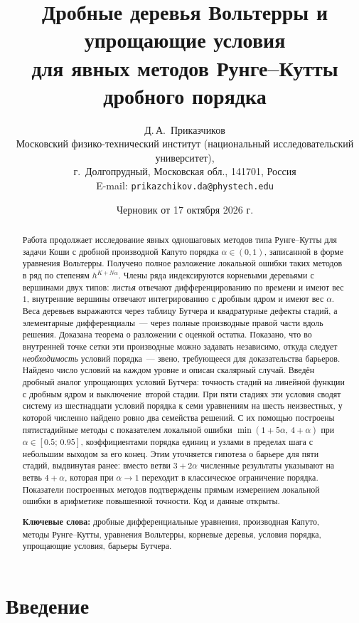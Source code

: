 \documentclass[11pt,a4paper]{article}
\title{Дробные деревья Вольтерры и упрощающие условия\\ для явных методов Рунге--Кутты дробного порядка}
\author{Д.\,А.~Приказчиков\\[2pt]
\small Московский физико-технический институт (национальный исследовательский университет),\\
\small г.~Долгопрудный, Московская обл., 141701, Россия\\
\small E-mail: \texttt{prikazchikov.da@phystech.edu}}
\date{Черновик от 17 октября 2026 г.}
\theoremstyle{plain}
\theoremstyle{definition}
\begin{document}
\maketitle

\begin{abstract}
Работа продолжает исследование явных одношаговых методов типа Рунге--Кутты для задачи Коши с дробной производной Капуто порядка $\alpha\in(0,1)$, записанной в форме уравнения Вольтерры. Получено полное разложение локальной ошибки таких методов в ряд по степеням $h^{K+N\alpha}$. Члены ряда индексируются корневыми деревьями с вершинами двух типов: листья отвечают дифференцированию по времени и имеют вес $1$, внутренние вершины отвечают интегрированию с дробным ядром и имеют вес $\alpha$. Веса деревьев выражаются через таблицу Бутчера и квадратурные дефекты стадий, а элементарные дифференциалы~--- через полные производные правой части вдоль решения. Доказана теорема о разложении с оценкой остатка. Показано, что во внутренней точке сетки эти производные можно задавать независимо, откуда следует \emph{необходимость} условий порядка~--- звено, требующееся для доказательства барьеров. Найдено число условий на каждом уровне и описан скалярный случай. Введён дробный аналог упрощающих условий Бутчера: точность стадий на линейной функции с дробным ядром и \guillemotleft выключение\guillemotright\ второй стадии. При пяти стадиях эти условия сводят систему из шестнадцати условий порядка к семи уравнениям на шесть неизвестных, у которой численно найдено ровно два семейства решений. С их помощью построены пятистадийные методы с показателем локальной ошибки $\min(1+5\alpha,\,4+\alpha)$ при $\alpha\in[0.5;\,0.95]$, коэффициентами порядка единиц и узлами в пределах шага с небольшим выходом за его конец. Этим уточняется гипотеза о барьере для пяти стадий, выдвинутая ранее: вместо ветви $3+2\alpha$ численные результаты указывают на ветвь $4+\alpha$, которая при $\alpha\to1$ переходит в классическое ограничение порядка. Показатели построенных методов подтверждены прямым измерением локальной ошибки в арифметике повышенной точности. Код и данные открыты.

\medskip\noindent\textbf{Ключевые слова:} дробные дифференциальные уравнения, производная Капуто, методы Рунге--Кутты, уравнения Вольтерры, корневые деревья, условия порядка, упрощающие условия, барьеры Бутчера.
\end{abstract}

\section{Введение}
\end{document}
